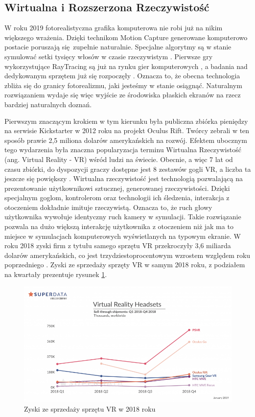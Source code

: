 \documentclass[12pt,twoside,polish]{article}
\begin{document}
\subsection {Wirtualna i Rozszerzona Rzeczywistość}
W roku 2019 fotorealistyczna grafika komputerowa nie robi już na nikim większego wrażenia. Dzięki technikom Motion Capture generowane komputerowo postacie poruszają się zupełnie naturalnie. Specjalne algorytmy są w stanie symulować setki tysięcy włosów w czasie rzeczywistym \cite{hairworks}. Pierwsze gry wykorzystujące RayTracing są już na rynku gier komputerowych \cite{raytracinggames}, a badania nad dedykowanym sprzętem już się rozpoczęły \cite{raytracinghardware}. Oznacza to, że obecna technologia zbliża się do granicy fotorealizmu, jaki jesteśmy w stanie osiągnąć. Naturalnym rozwiązaniem wydaje się więc wyjście ze środowiska płaskich ekranów na rzecz bardziej naturalnych doznań.

Pierwszym znaczącym krokiem w tym kierunku była publiczna zbiórka pieniędzy na serwisie Kickstarter w 2012 roku na projekt Oculus Rift. Twórcy zebrali w ten sposób prawie 2,5 miliona dolarów amerykańskich na rozwój. Efektem ubocznym tego wydarzenia była znaczna popularyzacja terminu Wirtualna Rzeczywistość (ang. Virtual Reality - VR) wśród ludzi na świecie. Obecnie, a więc 7 lat od czasu zbiórki, do dyspozycji graczy dostępne jest 8 zestawów gogli VR, a liczba ta jeszcze się powiększy \cite{steamvr}. Wirtualna rzeczywistość jest technologią pozwalającą na prezentowanie użytkownikowi sztucznej, generowanej rzeczywistości. Dzięki specjalnym goglom, kontrolerom oraz technologii ich śledzenia, interakcja z otoczeniem dokładnie imituje rzeczywistą. Oznacza to, że ruch głowy użytkownika wywołuje identyczny ruch kamery w symulacji. Takie rozwiązanie pozwala na dużo większą interakcję użytkownika z otoczeniem niż jak ma to miejsce w symulacjach komputerowych wyświetlanych na typowym ekranie. W roku 2018 zyski firm z tytułu samego sprzętu VR przekroczyły 3,6 miliarda dolarów amerykańskich, co jest trzydziestoprocentowym wzrostem względem roku poprzedniego \cite{vr2018}. Zyski ze sprzedaży sprzęty VR w samym 2018 roku, z podziałem na kwartały prezentuje rysunek \ref{vrincome}.

\begin{figure}
	\centering
	\includegraphics[width=\textwidth]{vr2018}
	\caption{Zyski ze sprzedaży sprzętu VR w 2018 roku \cite{vr2018img}}
	\label{vrincome}
\end{figure}
\end{document}
